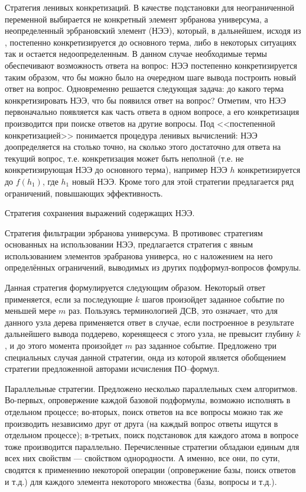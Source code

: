 \documentclass[a4paper]{report}
\begin{document}
Стратегия ленивых конкретизаций. В качестве подстановки для неограниченной переменной выбирается не конкретный элемент эрбранова универсума, а неопределенный эрбрановский элемент (НЭЭ), который, в дальнейшем, исходя из , постепенно конкретизируется до основного терма, либо в некоторых ситуациях так и остается недоопределенным. В данном случае необходимые термы обеспечивают возможность ответа на вопрос: НЭЭ постепенно конкретизируется таким образом, что бы можно было на очередном шаге вывода построить новый ответ на   вопрос. Одновременно решается следующая задача: до какого терма конкретизировать НЭЭ, что бы появился ответ на вопрос? Отметим, что НЭЭ первоначально появляется как часть ответа в одном вопросе, а его конкретизация производится при поиске ответов на другие вопросы. Под <<постепенной конкретизацией>> понимается процедура ленивых вычислений: НЭЭ доопределяется на столько точно, на сколько этого достаточно для ответа на текущий вопрос, т.е. конкретизация может быть неполной (т.е. не конкретизирующая НЭЭ до основного терма), например НЭЭ $h$ конкретизируется до $f(h_1)$, где $h_1$ новый НЭЭ. Кроме того для этой стратегии предлагается ряд ограничений, повышающих эффективность.

Стратегия сохранения выражений содержащих НЭЭ.

Стратегия фильтрации эрбранова универсума. В противовес стратегиям основанных на использовании НЭЭ, предлагается стратегия с явным использованием элементов эрабранова универса, но с наложением на него определённых ограничений, выводимых из других подформул-вопросов фомрулы.

Данная стратегия формулируется следующим образом. Некоторый ответ применяется, если за последующие $k$ шагов произойдет заданное событие по меньшей мере $m$ раз. Пользуясь терминологией ДСВ, это означает, что для данного узла дерева применяется ответ в случае, если построенное в результате дальнейшего вывода поддерево, коренящееся с этого узла, не превысит глубину $k$, и до этого момента произойдет $m$ раз заданное событие. Предложено три специальных случая данной стратегии, онда из которой является обобщением стратегии предложенной авторами исчисления ПО--формул.

Параллельные стратегии. Предложено несколько параллельных схем алгоритмов. Во-первых, опровержение каждой базовой подформулы, возможно исполнять в отдельном процессе; во-вторых, поиск ответов на все вопросы можно так же производить независимо друг от друга (на каждый вопрос ответы ищутся в отдельном процессе); в-третьих, поиск подстановок для каждого атома в вопросе тоже производится параллельно. Перечисленные стратегии обладаюи единым для всех них свойствм --- свойством однородности. А именно, все они, по сути, сводятся к применению некоторой операции (опровержение базы, поиск ответов и т.д.) для каждого элемента некоторого множества (базы, вопросы и т.д.).
\end{document}
